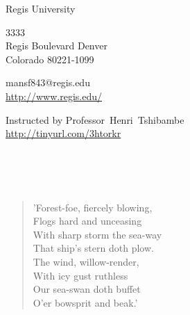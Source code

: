 \documentclass[11pt,a4paper]{scrartcl} %
\begin{document}
\pagecolor{Gray!20!Bittersweet!10}
\begin{cv}{}
        \begin{cvlist}{\textcolor{Sepia}{}}\label{PersDat}  
            \item   Regis University
            \item   3333\\
                    Regis Boulevard Denver \\	
                    Colorado 80221-1099
            \item   mansf843@regis.edu\\				
                    \url{http://www.regis.edu/}				
        \end{cvlist}
        \begin{cvlist}{}\label{irgendwas}
            \item Instructed by Professor~Henri~Tshibambe\\
             \url{http://tinyurl.com/3htorkr}
        \end{cvlist}
    \end{cv}
\clearpage

\noindent
\textcolor{OliveGreen}{}\\
\textcolor{Sepia}{\\
\citet[chapter 60]{sagadb}}\\
\begin{verse}
'Forest-foe, fiercely blowing,\\
Flogs hard and unceasing\\
With sharp storm the sea-way\\
That ship's stern doth plow.\\
The wind, willow-render,\\
With icy gust ruthless\\
Our sea-swan doth buffet\\
O'er bowsprit and beak.'\\
\end{verse}
\clearpage
\title{\textcolor{OliveGreen}{\rmfamily\normalfont{}}}
    \author{\textcolor{Sepia}{}}
    \date{} %
    
    \maketitle
    
\end{document}
